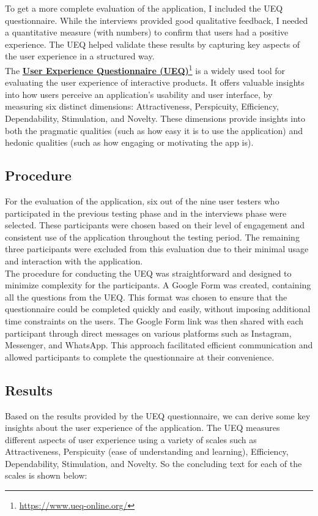 To get a more complete evaluation of the application, I included the UEQ questionnaire. While the interviews provided good qualitative feedback, I needed a quantitative measure (with numbers) to confirm that users had a positive experience. The UEQ helped validate these results by capturing key aspects of the user experience in a structured way.\vspace{5mm} \\
The \textbf{\href{https://www.ueq-online.org/}{User Experience Questionnaire (UEQ)}}\footnote{\url{https://www.ueq-online.org/}} is a widely used tool for evaluating the user experience of interactive products. It offers valuable insights into how users perceive an application’s usability and user interface, by measuring six distinct dimensions: Attractiveness, Perspicuity, Efficiency, Dependability, Stimulation, and Novelty. These dimensions provide insights into both the pragmatic qualities (such as how easy it is to use the application) and hedonic qualities (such as how engaging or motivating the app is).

\subsection{Procedure}
For the evaluation of the application, six out of the nine user testers who participated in the previous testing phase and in the interviews phase were selected. These participants were chosen based on their level of engagement and consistent use of the application throughout the testing period. The remaining three participants were excluded from this evaluation due to their minimal usage and interaction with the application.\vspace{5mm} \\
The procedure for conducting the UEQ was straightforward and designed to minimize complexity for the participants. A Google Form was created, containing all the questions from the UEQ. This format was chosen to ensure that the questionnaire could be completed quickly and easily, without imposing additional time constraints on the users. The Google Form link was then shared with each participant through direct messages on various platforms such as Instagram, Messenger, and WhatsApp. This approach facilitated efficient communication and allowed participants to complete the questionnaire at their convenience.

\subsection{Results}
Based on the results provided by the UEQ questionnaire, we can derive some key insights about the user experience of the application. The UEQ measures different aspects of user experience using a variety of scales such as Attractiveness, Perspicuity (ease of understanding and learning), Efficiency, Dependability, Stimulation, and Novelty. So the concluding text for each of the scales is shown below:

